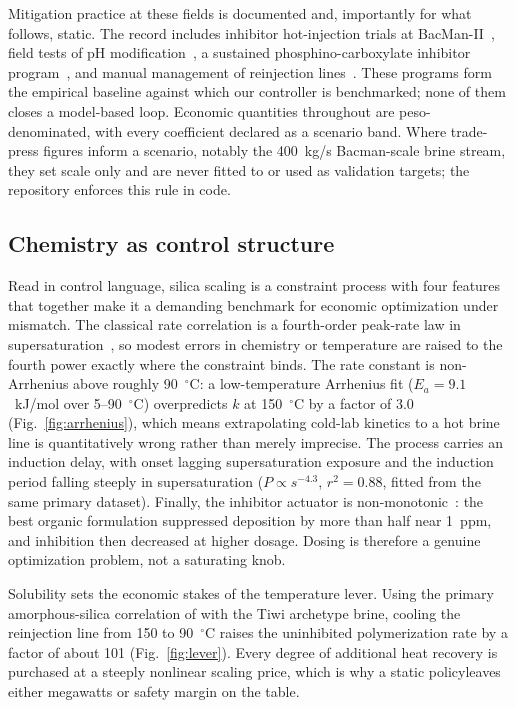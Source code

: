 \documentclass[review,number,sort&compress]{elsarticle}
\begin{document}
Mitigation practice at these fields is documented and, importantly for
what follows, static. The record includes inhibitor hot-injection
trials at BacMan-II~\citep{see2010wgc}, field tests of pH
modification~\citep{remoroza2008ph}, a sustained phosphino-carboxylate
inhibitor program~\citep{baltazar2014grc}, and manual management of
reinjection lines~\citep{kobayashi2024mahanagdong}. These programs form
the empirical baseline against which our controller is benchmarked;
none of them closes a model-based loop. Economic quantities throughout
are peso-denominated, with every coefficient declared as a scenario
band. Where trade-press figures inform a scenario, notably the
400~kg/s Bacman-scale brine stream, they set scale only and are never
fitted to or used as validation targets; the repository enforces this
rule in code.

\subsection{Chemistry as control structure}\label{sec:chemistry}

Read in control language, silica scaling is a constraint process with
four features that together make it a demanding benchmark for economic
optimization under mismatch. The classical rate correlation is a
fourth-order peak-rate law in
supersaturation~\citep{rothbaum1979rohde}, so modest errors in
chemistry or temperature are raised to the fourth power exactly where
the constraint binds. The rate constant is non-Arrhenius above roughly
90~$^{\circ}$C: a low-temperature Arrhenius fit ($E_a = 9.1$~kJ/mol
over 5--90~$^{\circ}$C) overpredicts $k$ at 150~$^{\circ}$C by a factor
of 3.0 (Fig.~\ref{fig:arrhenius}), which means extrapolating cold-lab
kinetics to a hot brine line is quantitatively wrong rather than merely
imprecise. The process carries an induction delay, with onset lagging
supersaturation exposure and the induction period falling steeply in
supersaturation ($P \propto s^{-4.3}$, $r^2 = 0.88$, fitted from the
same primary dataset). Finally, the inhibitor actuator is
non-monotonic~\citep{gallup2002investigations}: the best organic
formulation suppressed deposition by more than half near 1~ppm, and
inhibition then decreased at higher dosage. Dosing is therefore a
genuine optimization problem, not a saturating knob.

Solubility sets the economic stakes of the temperature lever. Using the
primary amorphous-silica correlation of \citet{gunnarsson2000amorphous}
with the Tiwi archetype brine, cooling the reinjection line from 150 to
90~$^{\circ}$C raises the uninhibited polymerization rate by a factor
of about 101 (Fig.~\ref{fig:lever}). Every degree of additional heat
recovery is purchased at a steeply nonlinear scaling price, which is
why a static policyleaves either megawatts or safety margin on the
table.
\end{document}
